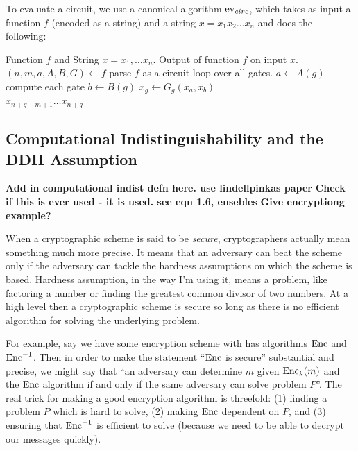 \newcommand{\fbar}{f^-}
\newcommand{\Topo}{\operatorname{Topo}}
\renewcommand{\algorithmicrequire}{\textbf{Input:}}
\renewcommand{\algorithmicensure}{\textbf{Output:}}

To evaluate a circuit, we use a canonical algorithm $\evcirc$, which takes as input a function $f$ (encoded as a string) and a string $x = x_1 x_2 \ldots x_n$ and does the following:

\begin{algorithm}
\caption{$\evcirc$}
\label{alg:evcirc}
\begin{algorithmic}
\Require Function $f$ and String $x = x_1, \ldots x_n$.
\Ensure Output of function $f$ on input $x$.
\State $(n,m,a,A,B,G) \gets f$
\Comment parse $f$ as a circuit
\Comment loop over all gates.
\State $a \gets A(g)$
\Comment compute each gate
\State $b \gets B(g)$
\State $x_g \gets G_g(x_a, x_b)$
\EndFor \\
\Return $x_{n+q-m+1} \ldots x_{n+q}$
\end{algorithmic}
\end{algorithm}

\subsection{Computational Indistinguishability and the DDH Assumption} 
\label{sctn:DDH}
\textbf{Add in computational indist defn here. use lindellpinkas paper}
\textbf{Check if this is ever used - it is used. see eqn 1.6, ensebles}
\textbf{Give encryptiong example?}

When a cryptographic scheme is said to be \textit{secure}, cryptographers actually mean something much more precise. 
It means that an adversary can beat the scheme only if the adversary can tackle the hardness assumptions on which the scheme is based.
Hardness assumption, in the way I'm using it, means a problem, like factoring a number or finding the greatest common divisor of two numbers.
At a high level then a cryptographic scheme is secure so long as there is no efficient algorithm for solving the underlying problem.

For example, say we have some encryption scheme with has algorithms $\operatorname{Enc}$ and $\operatorname{Enc}^{-1}$.
Then in order to make the statement ``$\operatorname{Enc}$ is secure'' substantial and precise, we might say that ``an adversary can determine $m$ given $\operatorname{Enc}_k(m)$ and the $\operatorname{Enc}$ algorithm if and only if the same adversary can solve problem $P$''.
The real trick for making a good encryption algorithm is threefold: (1) finding a problem $P$ which is hard to solve, (2) making $\operatorname{Enc}$ dependent on $P$, and (3) ensuring that $\operatorname{Enc}^{-1}$ is efficient to solve (because we need to be able to decrypt our messages quickly).

